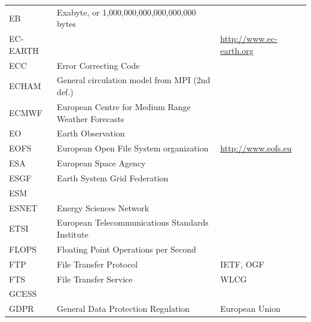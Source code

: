 \documentclass{../../template/esiwace-report}
\begin{document}
\begin{longtable}{|l|l|l|}
  EB          &         Exabyte, or 1,000,000,000,000,000,000 bytes   &                                       \\
  EC-EARTH    &                                                       &         \url{http://www.ec-earth.org} \\
  ECC         &       Error Correcting Code                           &                                       \\
  ECHAM       &         General circulation model from MPI (2nd def.) &                                       \\
  ECMWF       &         European Centre for Medium Range Weather Forecasts &                                  \\
  EO          &       Earth Observation                               &                                       \\
  EOFS        &  European Open File System organization        &   \url{http://www.eofs.eu}                                    \\
  ESA         &       European Space Agency                           &                                       \\
  ESGF        &       Earth System Grid Federation                    &                                       \\
  ESM         &                                                       &                                       \\
  ESNET       &       Energy Sciences Network                         &                                       \\
  ETSI        &         European Telecommunications Standards Institute &                                     \\
  FLOPS       &       Floating Point Operations per Second            &                                       \\
  FTP         &       File Transfer Protocol                          &       IETF, OGF                       \\
  FTS         &       File Transfer Service                           &       WLCG                            \\
  GCESS       &                                                       &                                       \\
  GDPR        &         General Data Protection Regulation            &         European Union                \\

\end{longtable}
\end{document}
